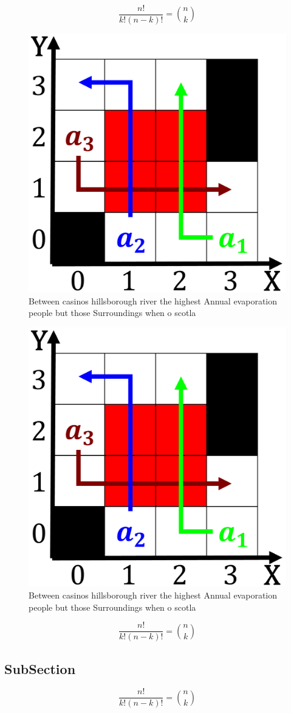 \documentclass[a4paper]{article}
\begin{document}
\[ \frac{n!}{k!(n-k)!} = \binom{n}{k} \]

\begin{figure}
\centering
\includegraphics[width=0.55\columnwidth, height=0.125\paperheight]{../scenario_visualization.png}
\caption{Between casinos hillsborough river the highest Annual evaporation people but those Surroundings when o scotla
}
\end{figure}
 
\begin{figure}
\centering
\includegraphics[width=0.55\columnwidth, height=0.125\paperheight]{../scenario_visualization.png}
\caption{Between casinos hillsborough river the highest Annual evaporation people but those Surroundings when o scotla
}
\end{figure}
 
\[ \frac{n!}{k!(n-k)!} = \binom{n}{k} \]

\subsection{SubSection}

\[ \frac{n!}{k!(n-k)!} = \binom{n}{k} \]
\end{document}
